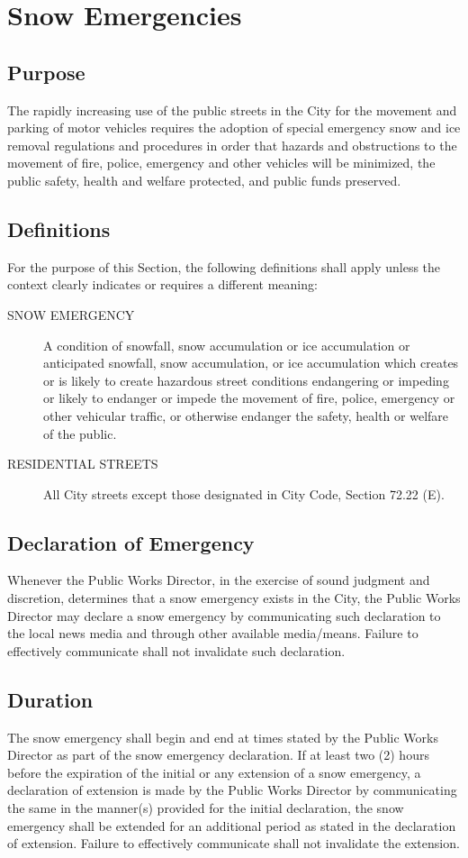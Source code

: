 \section{Snow Emergencies}
\subsection{Purpose}
The rapidly increasing use of the public streets in the City for the movement and parking of motor vehicles requires the adoption of special emergency snow and ice removal regulations and procedures in order that hazards and obstructions to the movement of fire, police, emergency and other vehicles will be minimized, the public safety, health and welfare protected, and public funds preserved.
\subsection{Definitions}
For the purpose of this Section, the following definitions shall apply unless the context clearly indicates or requires a different meaning:
\begin{description}
    \item[SNOW EMERGENCY] A condition of snowfall, snow accumulation or ice accumulation or anticipated snowfall, snow accumulation, or ice accumulation which creates or is likely to create hazardous street conditions endangering or impeding or likely to endanger or impede the movement of fire, police, emergency or other vehicular traffic, or otherwise endanger the safety, health or welfare of the public.
    \item[RESIDENTIAL STREETS] All City streets except those designated in City Code, Section 72.22 (E).
\end{description}
\subsection{Declaration of Emergency}
Whenever the Public Works Director, in the exercise of sound judgment and discretion, determines that a snow emergency exists in the City, the Public Works Director may declare a snow emergency by communicating such declaration to the local news media and through other available media/means.  Failure to effectively communicate shall not invalidate such declaration.
\subsection{Duration}
The snow emergency shall begin and end at times stated by the Public Works Director as part of the snow emergency declaration.  If at least two (2) hours before the expiration of the initial or any extension of a snow emergency, a declaration of extension is made by the Public Works Director by communicating the same in the manner(s) provided for the initial declaration, the snow emergency shall be extended for an additional period as stated in the declaration of extension.  Failure to effectively communicate shall not invalidate the extension.
